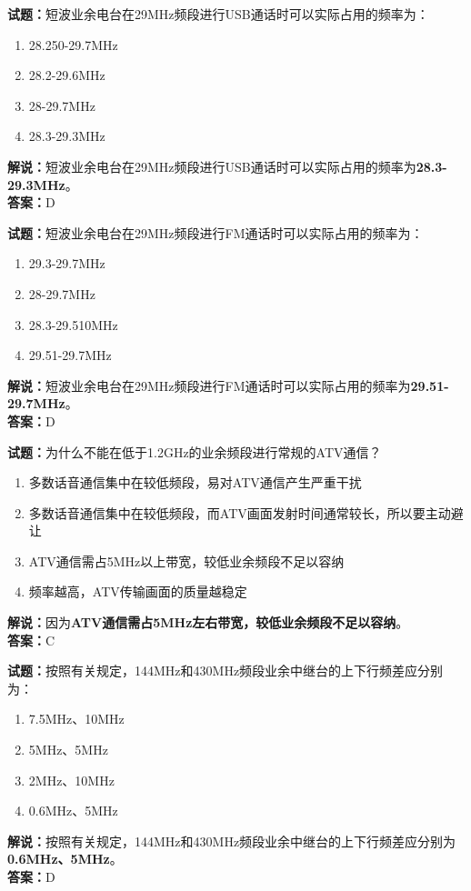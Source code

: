\documentclass{ctexbook}
\begin{document}
\bigskip

\noindent\textbf{试题：}短波业余电台在29\unit{\MHz}频段进行USB通话时可以实际占用的频率为：
\begin{enumerate}[leftmargin=3em]
  \item 28.250-29.7\unit{\MHz}
  \item 28.2-29.6\unit{\MHz}
  \item 28-29.7\unit{\MHz}
  \item 28.3-29.3\unit{\MHz}
\end{enumerate}
\noindent\textbf{解说：}短波业余电台在29\unit{\MHz}频段进行USB通话时可以实际占用的频率为\textbf{28.3-29.3\unit{\MHz}}。\\\noindent\textbf{答案：}D

\bigskip

\noindent\textbf{试题：}短波业余电台在29\unit{\MHz}频段进行FM通话时可以实际占用的频率为：
\begin{enumerate}[leftmargin=3em]
  \item 29.3-29.7\unit{\MHz}
  \item 28-29.7\unit{\MHz}
  \item 28.3-29.510\unit{\MHz}%
  \item 29.51-29.7\unit{\MHz}
\end{enumerate}
\noindent\textbf{解说：}短波业余电台在29\unit{\MHz}频段进行FM通话时可以实际占用的频率为\textbf{29.51-29.7\unit{\MHz}}。\\\noindent\textbf{答案：}D

\bigskip

\noindent\textbf{试题：}为什么不能在低于1.2\unit{\GHz}的业余频段进行常规的ATV通信？
\begin{enumerate}[leftmargin=3em]
  \item 多数话音通信集中在较低频段，易对ATV通信产生严重干扰
  \item 多数话音通信集中在较低频段，而ATV画面发射时间通常较长，所以要主动避让
  \item ATV通信需占5\unit{\MHz}以上带宽，较低业余频段不足以容纳
  \item 频率越高，ATV传输画面的质量越稳定
\end{enumerate}
\noindent\textbf{解说：}因为\textbf{ATV通信需占5\unit{\MHz}左右带宽，较低业余频段不足以容纳}。\\\noindent\textbf{答案：}C

\bigskip

\noindent\textbf{试题：}按照有关规定，144\unit{\MHz}和430\unit{\MHz}频段业余中继台的上下行频差应分别为：
\begin{enumerate}[leftmargin=3em]
  \item 7.5\unit{\MHz}、10\unit{\MHz}
  \item 5\unit{\MHz}、5\unit{\MHz}
  \item 2\unit{\MHz}、10\unit{\MHz}
  \item 0.6\unit{\MHz}、5\unit{\MHz}%
\end{enumerate}
\noindent\textbf{解说：}按照有关规定，144\unit{\MHz}和430\unit{\MHz}频段业余中继台的上下行频差应分别为\textbf{0.6\unit{\MHz}、5\unit{\MHz}}。\\\noindent\textbf{答案：}D
\end{document}
